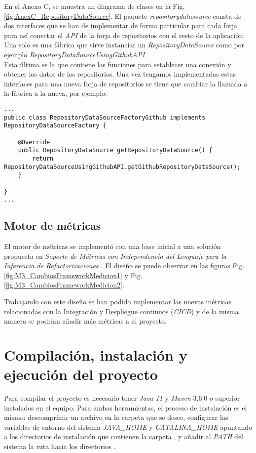 En el Anexo C, se muestra un diagrama de clases en la Fig. \ref{fig:AnexC_RepositoryDataSource}. El paquete \textit{repositorydatasource} consta de dos interfaces que se han de implementar de forma particular para cada forja para así conectar el \textit{API} de la forja de repositorios con el resto de la aplicación. \\
Una solo es una fábrica que sirve instanciar un \textit{RepositoryDataSource} como por ejemplo \textit{RepositoryDataSourceUsingGithubAPI}.\\ Esta última es la que contiene las funciones para establecer una conexión y obtener los datos de los repositorios. Una vez tengamos implementadas estas interfaces para una nueva forja de repositorios se tiene que cambiar la llamada a la fábrica a la nueva, por ejemplo:

\begin{minipage}{\linewidth}
\tiny \begin{verbatim}
...
public class RepositoryDataSourceFactoryGithub implements RepositoryDataSourceFactory {

	@Override
	public RepositoryDataSource getRepositoryDataSource() {
		return RepositoryDataSourceUsingGithubAPI.getGithubRepositoryDataSource();
	}

}
...
\end{verbatim}
\end{minipage}	

\subsection{Motor de métricas}
El motor de métricas se implementó con una base inicial a una solución propuesta en \textit{Soporte de Métricas con Independencia del Lenguaje para la Inferencia de Refactorizaciones} \cite{marticorena_sanchez_soporte_2005}. El diseño se puede observar en las figuras Fig. \ref{fig:M3_CambiosFrameworkMedicion1} y Fig. \ref{fig:M3_CambiosFrameworkMedicion2}.

Trabajando con este diseño se han podido implementar las nuevas métricas relacionadas con la Integración y Despliegue continuos (\textit{CICD}) y de la misma manera se podrían añadir más métricas a al proyecto.

\newpage
\section{Compilación, instalación y ejecución del proyecto}
Para compilar el proyecto es necesario tener \textit{Java 11} y \textit{Maven} 3.6.0 o superior instalados en el equipo. Para ambas herramientas, el proceso de instalación es el mismo: descomprimir un archivo en la carpeta que se desee, configurar las variables de entorno del sistema \textit{JAVA\_HOME} y  \textit{CATALINA\_HOME} apuntando a los directorios de instalación que contienen la carpeta , y añadir al \textit{PATH} del sistema la ruta hacia los directorios .\\

